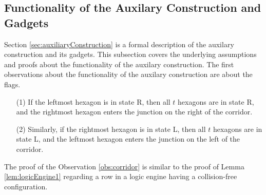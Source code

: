 \subsection{Functionality of the Auxilary Construction and Gadgets}
Section \ref{sec:auxiliaryConstruction} is a formal description of the auxilary construction and its gadgets.
This subsection covers the underlying assumptions and proofs about the functionality of the auxilary construction.
The first observations about the functionality of the auxilary construction are about the flags.
\begin{observation}\label{obs:corridor}
\begin{itemize}
\item[(1)] If the leftmost hexagon is in state R, then all $t$ hexagons are in state R, and the rightmost hexagon enters the junction on the right of the corridor.
\item[(2)] Similarly, if the rightmost hexagon is in state L, then all $t$ hexagons are in state L, and the leftmost hexagon enters the junction on the left of the corridor.
\end{itemize}
\end{observation}
The proof of the Observation \ref{obs:corridor} is similar to the proof of Lemma \ref{lem:logicEngine1} regarding a row in a logic engine having a collision-free configuration.
